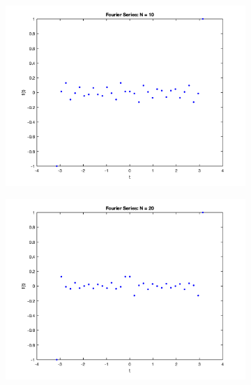 \documentclass[12pt]{article}
\begin{document}
\begin{figure}[h!]
\centering

\begin{subfigure}{0.49\columnwidth}
\centering
\includegraphics[width=\textwidth]{fs_n_10.png}
\caption{}
\label{fig:time1}
\end{subfigure}\hfill
\begin{subfigure}{0.49\columnwidth}
\centering
\includegraphics[width=\textwidth]{fs_n_20.png}
\caption{}
\label{fig:time2}
\end{subfigure}

\medskip


\end{figure}
\end{document}
